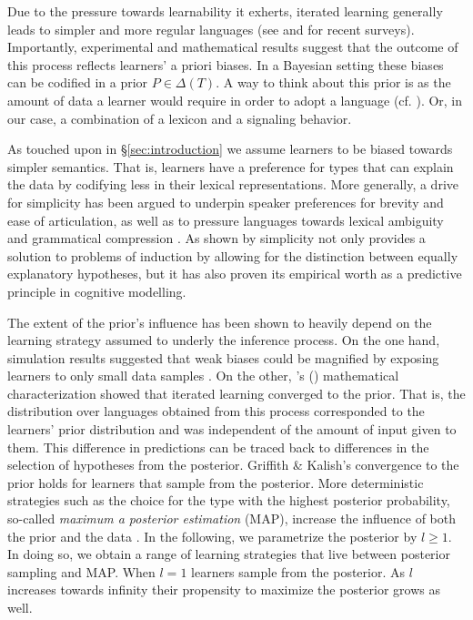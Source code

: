 \documentclass[a4paper]{article}
\newcommand{\citeposs}[2][]{\citeauthor{#2}'s (\citeyear[#1]{#2})}
\begin{document}
Due to the pressure towards learnability it exherts, iterated learning generally leads to simpler and more regular languages (see \citealt{kirby+etal:2014} and \citealt{tamariz+kirby:2016} for recent surveys). Importantly, experimental and mathematical results suggest that the outcome of this process reflects learners' a priori biases. In a Bayesian setting these biases can be codified in a prior $P \in \Delta(T)$. A way to think about this prior is as the amount of data a learner would require in order to adopt a language (cf. \citealt[450]{griffiths+kalish:2007}). Or, in our case, a combination of a lexicon and a signaling behavior. 

As touched upon in \S\ref{sec:introduction} we assume learners to be biased towards simpler semantics. That is, learners have a preference for types that can explain the data by codifying less in their lexical representations. More generally, a drive for simplicity has been argued to underpin speaker preferences for brevity and ease of articulation, as well as to pressure languages towards lexical ambiguity and grammatical compression \citep{zipf:1949,grice:1975,piantadosi+etal:2012, kirby+etal:2015}. As shown by \citet{chater+vitanyi:2003} simplicity not only provides a solution to problems of induction by allowing for the distinction between equally explanatory hypotheses, but it has also proven its empirical worth as a predictive principle in cognitive modelling.  

The extent of the prior's influence has been shown to heavily depend on the learning strategy assumed to underly the inference process. On the one hand, simulation results suggested that weak biases could be magnified by exposing learners to only small data samples \citep{brighton:2002}. On the other, \citeposs{griffiths+kalish:2007} mathematical characterization showed that iterated learning converged to the prior. That is, the distribution over languages obtained from this process corresponded to the learners' prior distribution and was independent of the amount of input given to them. This difference in predictions can be traced back to differences in the selection of hypotheses from the posterior. Griffith \& Kalish's convergence to the prior holds for learners that sample from the posterior. More deterministic strategies such as the choice for the type with the highest posterior probability, so-called {\it maximum a posterior estimation} (MAP), increase the influence of both the prior and the data \citep{griffiths+kalish:2007,kirby+etal:2007}. In the following, we parametrize the posterior by $l \geq 1$. In doing so, we obtain a range of learning strategies that live between posterior sampling and MAP. When $l = 1$ learners sample from the posterior. As $l$ increases towards infinity their propensity to maximize the posterior grows as well. 
\end{document}
